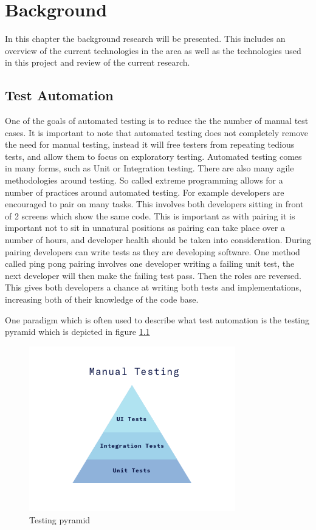 \chapter{Background}

In this chapter the background research will be presented. This includes an overview of the current technologies in the area as well as the technologies used in this project and review of the current research.

\section{Test Automation}

One of the goals of automated testing is to reduce the the number of manual test cases. It is important to note that automated testing does not completely remove the need for manual testing, instead it will free testers from repeating tedious tests, and allow them to focus on exploratory testing. Automated testing comes in many forms, such as Unit or Integration testing. There are also many agile methodologies around testing. So called extreme programming allows for a number of practices around automated testing. For example developers are encouraged to pair on many tasks. This involves both developers sitting in front of 2 screens which show the same code. This is important as with pairing it is important not to sit in unnatural positions as pairing can take place over a number of hours, and developer health should be taken into consideration. During pairing developers can write tests as they are developing software. One method called ping pong pairing involves one developer writing a failing unit test, the next developer will then make the failing test pass. Then the roles are reversed. This gives both developers a chance at writing both tests and implementations, increasing both of their knowledge of the code base. 

One paradigm which is often used to describe what test automation is the testing pyramid which is depicted in figure \ref{fig:testing-pyramid}

\begin{figure}[!h]
  \centering
    \includegraphics[width=0.8\textwidth]{figures/testing-pyramid.png}
    \caption{Testing pyramid}
    \label{fig:testing-pyramid}
\end{figure}

